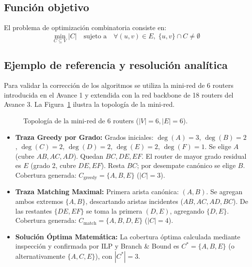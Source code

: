 \documentclass[11pt,a4paper]{article}
\begin{document}
\subsection{Función objetivo}
El problema de optimización combinatoria consiste en:
\begin{equation}
	\min_{C \subseteq V} |C| \quad \text{sujeto a} \quad \forall (u, v) \in E, \; \{u, v\} \cap C \neq \emptyset
\end{equation}

\subsection{Ejemplo de referencia y resolución analítica}
Para validar la corrección de los algoritmos se utiliza la mini-red de 6 routers introducida en el Avance 1 y extendida con la red backbone de 18 routers del Avance 3. La Figura~\ref{fig:ejemplo_red} ilustra la topología de la mini-red.

\begin{figure}[htbp]
\centering
{}
\caption{Topología de la mini-red de 6 routers ($|V|=6, |E|=6$).}
\label{fig:ejemplo_red}
\end{figure}

\begin{itemize}[itemsep=2pt]
	\item \textbf{Traza Greedy por Grado:} Grados iniciales: $\deg(A)=3$, $\deg(B)=2$, $\deg(C)=2$, $\deg(D)=2$, $\deg(E)=2$, $\deg(F)=1$. Se elige $A$ (cubre $AB, AC, AD$). Quedan $BC, DE, EF$. El router de mayor grado residual es $E$ (grado 2, cubre $DE, EF$). Resta $BC$; por desempate canónico se elige $B$. Cobertura generada: $C_{\text{greedy}} = \{A, B, E\}$ ($|C|=3$).
	\item \textbf{Traza Matching Maximal:} Primera arista canónica: $(A, B)$. Se agregan ambos extremos $\{A, B\}$, descartando aristas incidentes ($AB, AC, AD, BC$). De las restantes $\{DE, EF\}$ se toma la primera $(D, E)$, agregando $\{D, E\}$. Cobertura generada: $C_{\text{match}} = \{A, B, D, E\}$ ($|C|=4$).
	\item \textbf{Solución Óptima Matemática:} La cobertura óptima calculada mediante inspección y confirmada por ILP y Branch \& Bound es $C^* = \{A, B, E\}$ (o alternativamente $\{A, C, E\}$), con $|C^*| = 3$.
\end{itemize}
\end{document}
